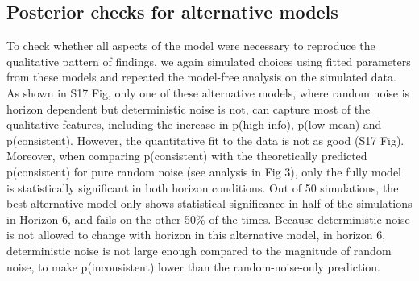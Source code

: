 \documentclass[12pt]{article}
\newcommand{\bcaption}[2]{\caption[#1]{\textbf{#1} #2}}
\renewcommand{\includegraphics}[2][]{}
\renewcommand{\caption}[1]{}
\begin{document}
	
	\newpage
	
	\subsection{Posterior checks for alternative models}	
	To check whether all aspects of the model were necessary to reproduce the qualitative pattern of findings, we again simulated choices using fitted parameters from these models and repeated the model-free analysis on the simulated data. As shown in S17 Fig, only one of these alternative models, where random noise is horizon dependent but deterministic noise is not, can capture most of the qualitative features, including the increase in p(high info), p(low mean) and p(consistent). However, the quantitative fit to the data is not as good (S17 Fig). Moreover, when comparing p(consistent) with the theoretically predicted p(consistent) for pure random noise (see analysis in Fig 3), only the fully model is statistically significant in both horizon conditions. Out of 50 simulations, the best alternative model only shows statistical significance in half of the simulations in Horizon 6, and fails on the other 50\% of the times. Because deterministic noise is not allowed to change with horizon in this alternative model, in horizon 6, deterministic noise is not large enough compared to the magnitude of random noise, to make p(inconsistent) lower than the random-noise-only prediction.   %
	
\end{document}

